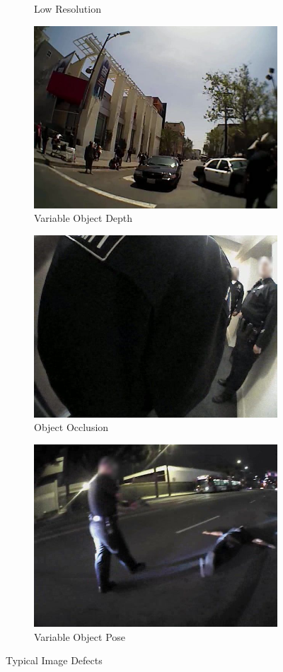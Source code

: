 \documentclass[a4paper]{article}
\begin{document}
\begin{figure}[H]
\begin{subfigure}{.33\textwidth}
	\caption{Low Resolution}
    \label{fig:sfig3}
\end{subfigure}
\begin{subfigure}{.33\textwidth}
	\centering
    \includegraphics[width=.8\linewidth]{depth_censored.jpg}
	\caption{Variable Object Depth}
    \label{fig:sfig4}
\end{subfigure}
\begin{subfigure}{.33\textwidth}
	\centering
    \includegraphics[width=.8\linewidth]{occlusionnew_censored.jpg}
	\caption{Object Occlusion}
    \label{fig:sfig5}
\end{subfigure}
\begin{subfigure}{.33\textwidth}
	\centering
    \includegraphics[width=.8\linewidth]{pose_censored.jpg}
	\caption{Variable Object Pose}
    \label{fig:sfig6}
\end{subfigure}
\caption{Typical Image Defects}
\label{fig:defects}
\end{figure}
\end{document}
